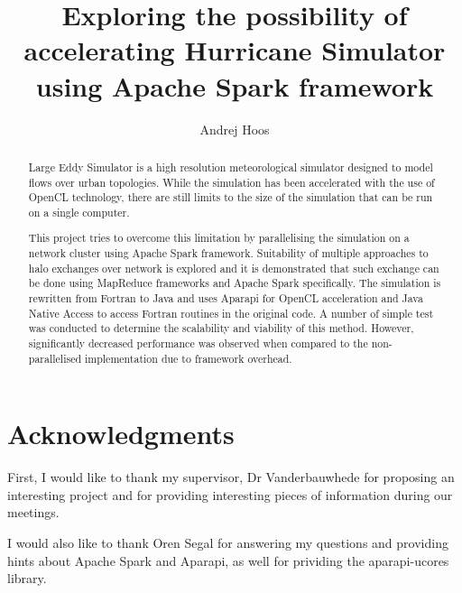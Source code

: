 \documentclass{l4proj}
\begin{document}
\title{Exploring the possibility of accelerating Hurricane Simulator \\ using Apache Spark framework}
\author{Andrej Hoos}
\maketitle

\begin{abstract}
Large Eddy Simulator is a high resolution meteorological simulator designed to model
flows over urban topologies. While the simulation has been accelerated with the use of 
OpenCL technology, there are still limits to the size of the simulation that can be run on a single computer.

This project tries to overcome this limitation by parallelising the simulation on a 
network cluster using Apache Spark framework. Suitability of multiple approaches to 
halo exchanges over network is explored and it is demonstrated that such exchange 
can be done using MapReduce frameworks and Apache Spark specifically. The simulation 
is rewritten from Fortran to Java and uses Aparapi for OpenCL acceleration and Java Native Access 
to access Fortran routines in the original code. A number of simple test was conducted 
to determine the scalability and viability of this method. However, significantly 
decreased performance was observed when compared to the non-parallelised implementation 
due to framework overhead.
\end{abstract}

\educationalconsent
%
%

\newpage
\vspace*{\fill}
\section*{\centering Acknowledgments}
First, I would like to thank my supervisor, Dr Vanderbauwhede for proposing an interesting
project and for providing interesting pieces of information during our meetings.

I would also like to thank Oren Segal for answering my questions and providing hints about 
Apache Spark and Aparapi, as well for prividing the aparapi-ucores library.
\vspace*{\fill}

\tableofcontents
\end{document}
